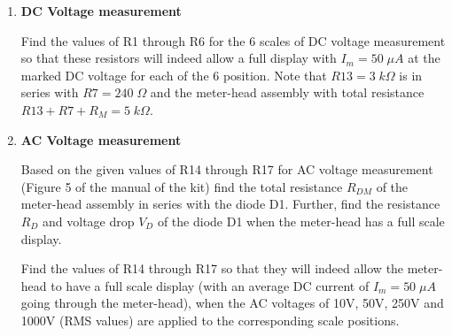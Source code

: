 \begin{enumerate}
\item {\bf DC Voltage measurement}
  
  Find the values of R1 through R6 for the 6 scales of DC voltage measurement
  so that these resistors will indeed allow a full display with $I_m=50\;\mu A$ 
  at the marked DC voltage for each of the 6 position. Note that $R13=3\;k\Omega$ 
  is in series with $R7=240\;\Omega$ and the meter-head assembly with total 
  resistance $R13+R7+R_M=5\;k\Omega$. 
  
  \begin{comment}
  
  {\bf Solution:}

  As shown in Figure 4, the circuit for each scale of the DC voltage measurement 
  is a voltage divider with an internal resistance for the meter-head:
  \begin{itemize}
  \item 0.5V
    \[
    0.5\;\frac{5}{R6+5}=0.25,\;\;\;\;\;\;\;R6=5\;k\Omega
    \]
  \item 2.5V
    \[
    2.5\;\frac{5}{R5+R6+5}=0.25,\;\;\;\;\;\;\;R5=40\;k\Omega
    \]
  \item 10V
    \[
    10\;\frac{5}{R4+R5+R6+5}=0.25,\;\;\;\;\;\;\;R4=150\;k\Omega
    \]
  \item 50V
    \[
    50\;\frac{5}{R3+R4+R5+R6+5}=0.25,\;\;\;\;\;\;\;R3=800\;k\Omega
    \]
  \item 250V
    \[
    250\;\frac{5}{R2+R3+R4+R5+R6+5}=0.25,\;\;\;\;\;\;\;R2=4\;M\Omega
    \]
  \item 1000V
    \[
    1000\;\frac{5}{R1+R2+R3+R4+R5+R6+5}=0.25,\;\;\;\;\;\;\;R1=15\;M\Omega
    \]
  \end{itemize}
  \end{comment}


\item {\bf AC Voltage measurement}

  Based on the given values of R14 through R17 for AC voltage measurement
  (Figure 5 of the manual of the kit) find the total resistance $R_{DM}$
  of the meter-head assembly in series with the diode D1. Further, find 
  the resistance $R_D$ and voltage drop $V_D$ of the diode D1 when the 
  meter-head has a full scale display. 

  Find the values of R14 through R17 so that they will indeed allow the 
  meter-head to have a full scale display (with an average DC current of 
  $I_m=50\;\mu A$ going through the meter-head), when the AC voltages of
  10V, 50V, 250V and 1000V (RMS values) are applied to the corresponding 
  scale positions.


\end{enumerate}
